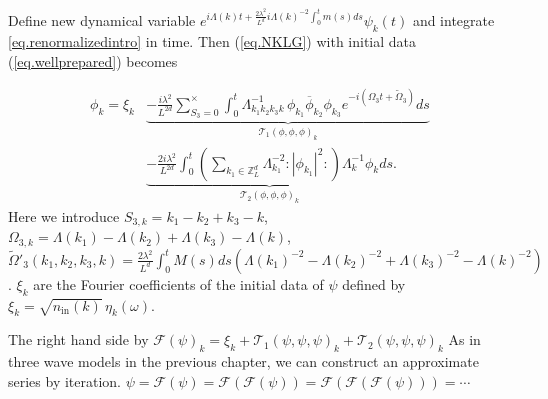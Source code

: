 

Define new dynamical variable $e^{i\Lambda(k) t+\frac{2\lambda^2}{L^{d}} i \Lambda(k)^{-2}\int^t_{0}m(s) ds} \psi_k(t)$ and integrate \eqref{eq.renormalizedintro} in time. Then (\ref{eq.NKLG}) with initial data (\ref{eq.wellprepared}) becomes

\begin{equation}\label{eq.intmainintro}
 \begin{split}
 \phi_k =\xi_k
 &\underbrace{- \frac{i\lambda^2}{L^{2d}} \sum\limits^{\times}_{S_3=0} \int^{t}_0 \Lambda_{k_1k_2k_3k}^{-1}\,\phi_{k_1}\overline{\phi}_{k_2} \phi_{k_3}e^{- i (\Omega_3t+\widetilde{\Omega}_3)} ds}_{\mathcal{T}_1(\phi,\phi,\phi)_k}
 \\
 &\underbrace{- \frac{2i\lambda^2}{L^{2d}} \int^{t}_0 \left(\sum\limits_{k_1\in \mathbb{Z}^d_L} \Lambda_{k_1}^{-2}:|\phi_{k_1}|^2: \right) \Lambda_{k}^{-1}\phi_{k} ds}_{\mathcal{T}_2(\phi,\phi,\phi)_k}.
 \end{split}
 \end{equation}
Here we introduce $S_{3,k}=k_1-k_2+k_3-k$, $\Omega_{3,k}=\Lambda(k_1)-\Lambda(k_2)+\Lambda(k_3)-\Lambda(k)$, $\widetilde{\Omega}'_3(k_1,k_2,k_3,k)=\frac{2\lambda^2}{L^{d}} \int^t_{0}M(s) ds\left(\Lambda(k_1)^{-2}-\Lambda(k_2)^{-2}+\Lambda(k_3)^{-2}-\Lambda(k)^{-2}\right)$. $\xi_k$ are the Fourier coefficients of the initial data of $\psi$ defined by $\xi_k=\sqrt{n_{\textrm{in}}(k)} \, \eta_{k}(\omega)$.

The right hand side by $\mathcal{F}(\psi)_k=\xi_k+\mathcal{T}_1(\psi,\psi,\psi)_k + \mathcal{T}_2(\psi,\psi,\psi)_k$ As in three wave models in the previous chapter, we can construct an approximate series by iteration. $\psi=\mathcal{F}(\psi)=\mathcal{F}(\mathcal{F}(\psi))=\mathcal{F}(\mathcal{F}(\mathcal{F}(\psi)))=\cdots$

